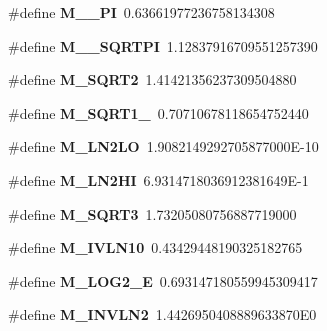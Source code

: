\begin{CompactItemize}
\#define {\bf M\_\_\-PI}\ 0.63661977236758134308
\item 
\#define {\bf M\_\_\-SQRTPI}\ 1.12837916709551257390
\item 
\#define {\bf M\_\-SQRT2}\ 1.41421356237309504880
\item 
\#define {\bf M\_\-SQRT1\_}\ 0.70710678118654752440
\item 
\#define {\bf M\_\-LN2LO}\ 1.9082149292705877000E-10
\item 
\#define {\bf M\_\-LN2HI}\ 6.9314718036912381649E-1
\item 
\#define {\bf M\_\-SQRT3}\ 1.73205080756887719000
\item 
\#define {\bf M\_\-IVLN10}\ 0.43429448190325182765
\item 
\#define {\bf M\_\-LOG2\_\-E}\ 0.693147180559945309417
\item 
\#define {\bf M\_\-INVLN2}\ 1.4426950408889633870E0
\end{CompactItemize}
